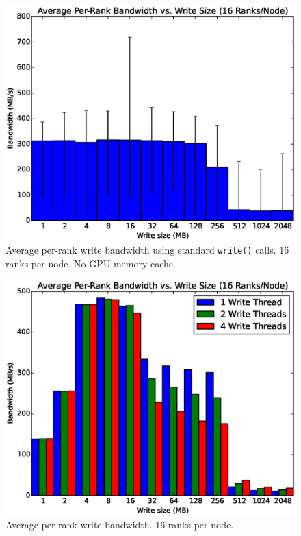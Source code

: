 
\begin{figure}
\includegraphics[width=\linewidth]{figures/figure_6.eps}
\caption{Average per-rank write bandwidth using standard \texttt{write()} calls.  16 ranks per node. No GPU memory cache.} 
\label{fig:results_base_16}
\end{figure}

\begin{figure}
\includegraphics[width=\linewidth]{figures/figure_4.eps}
\caption{Average per-rank write bandwidth.  16 ranks per node.} 
\label{fig:results_16_nobars}
\end{figure}

